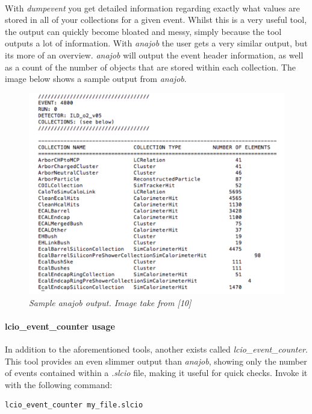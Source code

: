 \documentclass[11pt]{article}
\begin{document}
\paragraph{}
With \textit{dumpevent} you get detailed information regarding exactly what values are stored in all of your collections for a given event. Whilst this is a very useful tool, the output can quickly become bloated and messy, simply because the tool outputs a lot of information. With \textit{anajob} the user gets a very similar output, but its more of an overview. \textit{anajob} will output the event header information, as well as a count of the number of objects that are stored within each collection. The image below shows a sample output from \textit{anajob}.
\begin{figure}[!ht]
	\centering
	\includegraphics[scale=0.4]{anajob.png}
	\caption{\textit{Sample anajob output. Image take from [10]}}
\end{figure}
\paragraph{lcio\_event\_counter usage}
In addition to the aforementioned tools, another exists called \textit{lcio\_event\_counter}. This tool provides an even slimmer output than \textit{anajob}, showing only the number of events contained within a \textit{.slcio} file, making it useful for quick checks. Invoke it with the following command:
\begin{verbatim}
lcio_event_counter my_file.slcio
\end{verbatim}
\end{document}
